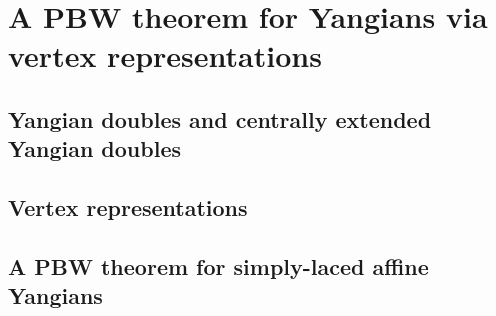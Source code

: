 \section{A PBW theorem for Yangians via vertex representations}
    \subsection{Yangian doubles and centrally extended Yangian doubles}

    \subsection{Vertex representations}

    \subsection{A PBW theorem for simply-laced affine Yangians}